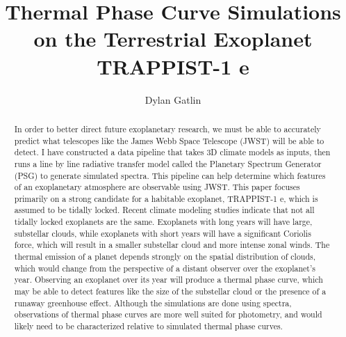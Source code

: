 \documentclass[preprint2]{aastex63}
\begin{document}
\title{Thermal Phase Curve Simulations on the Terrestrial Exoplanet
 TRAPPIST-1 e}

\author{Dylan Gatlin}

\begin{abstract}
In order to better direct future exoplanetary research, we must be
 able to accurately predict what telescopes like the James Webb Space Telescope
 (JWST) will be able to detect. I have constructed a data pipeline that takes
 3D climate models as inputs, then runs a line by line radiative transfer model
 called the Planetary Spectrum Generator (PSG) to generate simulated spectra.
 This pipeline can help determine which features of an exoplanetary atmosphere
 are observable using JWST. This paper focuses primarily on a strong candidate
 for a habitable exoplanet, TRAPPIST-1 e, which is assumed to be tidally locked.
 Recent climate modeling studies indicate that not all tidally locked exoplanets
 are the same. Exoplanets with long years will have large, substellar clouds,
 while exoplanets with short years will have a significant Coriolis force,
 which will result in a smaller substellar cloud and more intense zonal winds.
 The thermal emission of a planet depends strongly on the spatial
 distribution of clouds, which would change from the perspective of a distant
 observer over the exoplanet's year. Observing an exoplanet over its year will
 produce a thermal phase curve, which may be able to detect features like the
 size of the substellar cloud or the presence of a runaway greenhouse effect.
 Although the simulations are done using spectra, observations of
 thermal phase curves are more well suited for photometry, and would likely need
 to be characterized relative to simulated thermal phase curves.

\end{abstract}
 

% 
% 
% 
% 
% 
% 


% 
\end{document}
